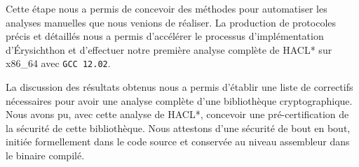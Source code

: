 Cette étape nous a permis de concevoir des méthodes pour automatiser les analyses manuelles que nous venions de réaliser. La production de protocoles précis et détaillés nous a permis d'accélérer le processus d'implémentation d'Érysichthon et d'effectuer notre première analyse complète de HACL* sur x86\_64 avec \texttt{GCC 12.02}.\smallbreak

La discussion des résultats obtenus nous a permis d'établir une liste de correctifs nécessaires pour avoir une analyse complète d'une bibliothèque cryptographique. Nous avons pu, avec cette analyse de HACL*, concevoir une pré-certification de la sécurité de cette bibliothèque. Nous attestons d'une sécurité de bout en bout, initiée formellement dans le code source et conservée au niveau assembleur dans le binaire compilé.
